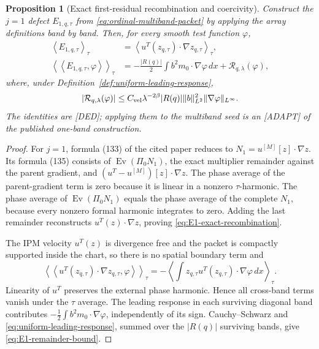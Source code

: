\documentclass[11pt]{amsart}
\numberwithin{equation}{section}
\theoremstyle{plain}
\newtheorem{proposition}[theorem]{Proposition}
\theoremstyle{definition}
\theoremstyle{remark}
\begin{document}
\begin{proposition}[Exact first-residual recombination and coercivity]
\label{prop:first-residual-coercivity}
Construct the $j=1$ defect $E_{1,q,\tau}$ from
\eqref{eq:ordinal-multiband-packet} by applying the array definitions
\cite[(133)--(135)]{AlpogeBuckmasterCoiculescu2026} band by band.  Then, for
every smooth test function $\varphi$,
\begin{align}
 \left\langle E_{1,q,\tau}\right\rangle_\tau
 &=\left\langle
 u^T(z_{q,\tau})\cdot\nabla z_{q,\tau}
 \right\rangle_\tau,
\label{eq:E1-exact-recombination}\\
 \left\langle\left\langle E_{1,q,\tau},\varphi\right\rangle
 \right\rangle_\tau
 &=-\frac{|R(q)|}{2}\int b^2m_0\cdot\nabla\varphi\,dx
 +\mathcal R_{q,\lambda}(\varphi),
\label{eq:E1-weak-coercive-form}
\end{align}
where, under Definition~\ref{def:uniform-leading-response},
\begin{equation}
 |\mathcal R_{q,\lambda}(\varphi)|
 \le C_{\rm vel}\lambda^{-2\beta}|R(q)|\|b\|_{L^2}^2
       \|\nabla\varphi\|_{L^\infty}.
\label{eq:E1-remainder-bound}
\end{equation}
The identities are \textup{[DED]}; applying them to the multiband seed is an
\textup{[ADAPT]} of the published one-band construction.
\end{proposition}

\begin{proof}
For $j=1$, formula (133) of the cited paper reduces to
$N_1=u^{[M]}[z]\cdot\nabla z$.  Its formula (135) consists of
$\operatorname{Ev}(\Pi_0N_1)$, the exact multiplier remainder against the
parent gradient, and $(u^T-u^{[M]})[z]\cdot\nabla z$.  The phase average of
the parent-gradient term is zero because it is linear in a nonzero
$\tau$-harmonic.  The phase average of
$\operatorname{Ev}(\Pi_0N_1)$ equals the phase average of the complete
$N_1$, because every nonzero formal harmonic integrates to zero.  Adding the
last remainder reconstructs $u^T(z)\cdot\nabla z$, proving
\eqref{eq:E1-exact-recombination}.

The IPM velocity $u^T(z)$ is divergence free and the packet is compactly
supported inside the chart, so there is no spatial boundary term and
\begin{equation}
 \left\langle\left\langle
 u^T(z_{q,\tau})\cdot\nabla z_{q,\tau},\varphi
 \right\rangle\right\rangle_\tau
 =-\left\langle\int z_{q,\tau}u^T(z_{q,\tau})
       \cdot\nabla\varphi\,dx\right\rangle_\tau.
\label{eq:divergence-free-flux}
\end{equation}
Linearity of $u^T$ preserves the external phase harmonic.  Hence all
cross-band terms vanish under the $\tau$ average.  The leading response in
each surviving diagonal band contributes
$-\tfrac12\int b^2m_0\cdot\nabla\varphi$, independently of its sign.
Cauchy--Schwarz and \eqref{eq:uniform-leading-response}, summed over the
$|R(q)|$ surviving bands, give \eqref{eq:E1-remainder-bound}.
\end{proof}
\end{document}
